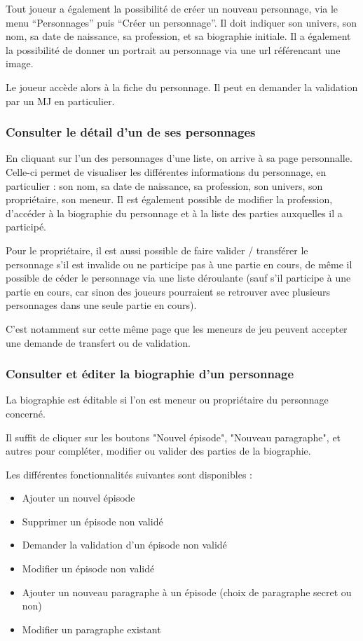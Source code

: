 \documentclass[a4paper, 11pt, titlepage]{article}
\begin{document}
Tout joueur a également la possibilité de créer un nouveau personnage, via le menu “Personnages” puis “Créer un personnage”. Il doit indiquer son univers, son nom, sa date de naissance, sa profession, et sa biographie initiale. Il a également la possibilité de donner un portrait au personnage via une url référencant une image.

Le joueur accède alors à la fiche du personnage. Il peut en demander la validation par un MJ en particulier.

\subsubsection {Consulter le détail d'un de ses personnages}

En cliquant sur l'un des personnages d'une liste, on arrive à sa page personnalle. Celle-ci permet de visualiser les différentes informations du personnage, en particulier : son nom, sa date de naissance, sa profession, son univers, son propriétaire, son meneur.
Il est également possible de modifier la profession, d'accéder à la biographie du personnage et à la liste des parties auxquelles il a participé.

Pour le propriétaire, il est aussi possible de faire valider / transférer le personnage s'il est invalide ou ne participe pas à une partie en cours, de même il possible de céder le personnage via une liste déroulante (sauf s'il participe à une partie en cours, car sinon des joueurs pourraient se retrouver avec plusieurs personnages dans une seule partie en cours).

C'est notamment sur cette même page que les meneurs de jeu peuvent accepter une demande de transfert ou de validation.


\subsubsection {Consulter et éditer la biographie d'un personnage}

La biographie est éditable si l'on est meneur ou propriétaire du personnage concerné.

Il suffit de cliquer sur les boutons "Nouvel épisode", "Nouveau paragraphe", et autres pour compléter, modifier ou valider des parties de la biographie.

Les différentes fonctionnalités suivantes sont disponibles :
\begin{itemize}
\item
Ajouter un nouvel épisode
\item
Supprimer un épisode non validé
\item
Demander la validation d'un épisode non validé
\item
Modifier un épisode non validé
\item
Ajouter un nouveau paragraphe à un épisode (choix de paragraphe secret ou non)
\item
Modifier un paragraphe existant
\end{itemize}
\end{document}
